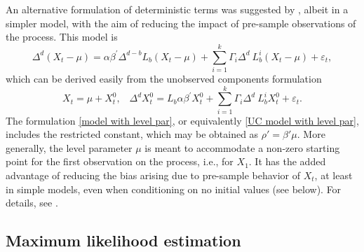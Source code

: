 \documentclass[article]{jss}
\begin{document}
An alternative formulation of deterministic terms was suggested by \cite{johansen2014initial}, albeit in a simpler model, with the aim of reducing the impact of pre-sample observations of the process. This model is
\begin{equation}
\Delta^{d}(X_{t}-\mu)= \alpha \beta^{\prime} \Delta^{d-b} L_{b} (X_{t}-\mu) + 
\sum_{i=1}^{k}\Gamma_{i}\Delta^{d}\ L_{b}^{i}(X_{t}-\mu)
+ \varepsilon_{t},
\label{model with level par}
\end{equation}
which can be derived easily from the unobserved components formulation
\begin{equation}
X_t = \mu + X_t^0, \; \; \;
\Delta^{d}X_{t}^0=L_{b} \alpha \beta^{\prime} X_{t}^0 + 
\sum_{i=1}^{k}\Gamma_{i}\Delta^{d}\ L_{b}^{i}X_{t}^0
+ \varepsilon_{t}.
\label{UC model with level par}
\end{equation}
The formulation \eqref{model with level par}, or equivalently \eqref{UC model with level par}, includes the restricted constant, which may be obtained as $\rho'=\beta'\mu$. More generally, the level parameter $\mu$ is meant to accommodate a non-zero starting point for the first observation on the process, i.e., for $X_1$. It has the added advantage of reducing the bias arising due to pre-sample behavior of $X_t$, at least in simple models, even when conditioning on no initial values (see below). For details, see \cite{johansen2014initial}.


\subsection{Maximum likelihood estimation}
\end{document}
